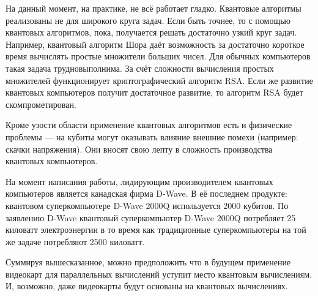 На данный момент, на практике, не всё работает гладко. Квантовые алгоритмы реализованы не для широкого круга задач. Если быть точнее, то с помощью квантовых алгоритмов, пока, получается решать достаточно узкий круг задач. Например, квантовый алгоритм Шора даёт возможность за достаточно короткое время вычислять простые множители больших чисел. Для обычных компьютеров такая задача трудновыполнима. За счёт сложности вычисления простых множителей функционирует криптографический алгоритм RSA. Если же развитие квантовых компьютеров получит достаточное развитие, то алгоритм RSA будет скомпрометирован\cite{ran}.

Кроме узости области применение квантовых алгоритмов есть и физические проблемы --- на кубиты могут оказывать влияние внешние помехи (например: скачки напряжения). Они вносят свою лепту в сложность производства квантовых компьютеров.

На момент написания работы, лидирующим производителем квантовых компьютеров является канадская фирма D-Wave\cite{dwave}. В её последнем продукте: квантовом суперкомпьютере D-Wave 2000Q используется 2000 кубитов. По заявлению D-Wave квантовый суперкомпьютер D-Wave 2000Q потребляет 25 киловатт электроэнергии в то время как традиционные суперкомпьютеры на той же задаче потребляют 2500 киловатт\cite{dwave2000q}.

Суммируя вышесказанное, можно предположить что в будущем применение видеокарт для параллельных вычислений уступит место квантовым вычислениям. И, возможно, даже видеокарты будут основаны на квантовых вычислениях.
